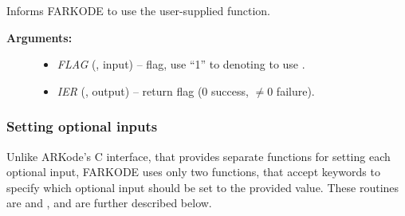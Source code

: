\documentclass[letterpaper,10pt,english]{sphinxmanual}
\begin{document}
\begin{fulllineitems}
\label{f_interface/Usage:f/_/FARKEWTSET}
Informs FARKODE to use the user-supplied {\hyperref[f_interface/Usage:f/_/FARKEWT]{}} function.
\begin{description}
\item[{\textbf{Arguments:}}] \leavevmode\begin{itemize}
\item {} 
\emph{FLAG} (, input) -- flag, use ``1'' to denoting to use {\hyperref[f_interface/Usage:f/_/FARKEWT]{}}.

\item {} 
\emph{IER} (, output) -- return flag (0 success, $\ne 0$ failure).

\end{itemize}

\end{description}

\end{fulllineitems}



\subsubsection{Setting optional inputs}
\label{f_interface/Usage:setting-optional-inputs}\label{f_interface/Usage:finterface-optionalinputs}
Unlike ARKode's C interface, that provides separate functions for
setting each optional input, FARKODE uses only two functions, that
accept keywords to specify which optional input should be set to the
provided value.  These routines are {\hyperref[f_interface/Usage:f/_/FARKSETIIN]{}} and
{\hyperref[f_interface/Usage:f/_/FARKSETRIN]{}}, and are further described below.
\end{document}
